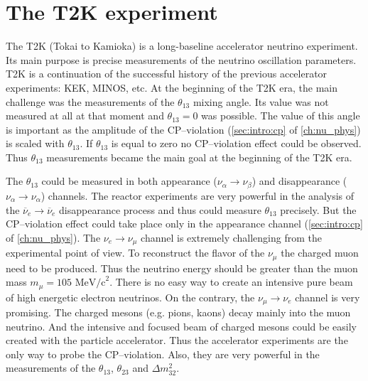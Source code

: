 \documentclass[../main.tex]{subfiles}
\begin{document}
\renewcommand{\labelitemi}{\ding{226}}
\renewcommand{\labelitemii}{\ding{227}}

\chapter{The T2K experiment}
\label{ch:T2K:general}

The T2K (Tokai to Kamioka) is a long-baseline accelerator neutrino experiment. Its main purpose is precise measurements of the neutrino oscillation parameters. T2K is a continuation of the successful history of the previous accelerator experiments: KEK, MINOS, etc. At the beginning of the T2K era, the main challenge was the measurements of the $\theta_{13}$ mixing angle. Its value was not measured at all at that moment and $\theta_{13}=0$ was possible. The value of this angle is important as the amplitude of the CP--violation (\autoref{sec:intro:cp} of \autoref{ch:nu_phys}) is scaled with $\theta_{13}$. If $\theta_{13}$ is equal to zero no CP--violation effect could be observed. Thus $\theta_{13}$ measurements became the main goal at the beginning of the T2K era.

The $\theta_{13}$ could be measured in both appearance ($\nu_\alpha\to\nu_\beta$) and disappearance ($\nu_\alpha\to\nu_\alpha$) channels. The reactor experiments are very powerful in the analysis of the $\overline{\nu}_e\to\overline{\nu}_e$ disappearance process and thus could measure $\theta_{13}$ precisely. But the CP--violation effect could take place only in the appearance channel (\autoref{sec:intro:cp} of \autoref{ch:nu_phys}). The $\nu_e\to\nu_\mu$ channel is extremely challenging from the experimental point of view. To reconstruct the flavor of the $\nu_\mu$ the charged muon need to be produced. Thus the neutrino energy should be greater than the muon mass $m_\mu=105\text{ MeV/c}^2$. There is no easy way to create an intensive pure beam of high energetic electron neutrinos. On the contrary, the $\nu_\mu\to\nu_e$ channel is very promising. The charged mesons (e.g. pions, kaons) decay mainly into the muon neutrino. And the intensive and focused beam of charged mesons could be easily created with the particle accelerator. Thus the accelerator experiments are the only way to probe the CP--violation. Also, they are very powerful in the measurements of the $\theta_{13}$, $\theta_{23}$ and $\Delta m^2_{32}.$
\end{document}
